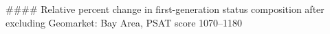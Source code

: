 #### Relative percent change in first-generation status composition after excluding Geomarket: Bay Area, PSAT score 1070–1180
